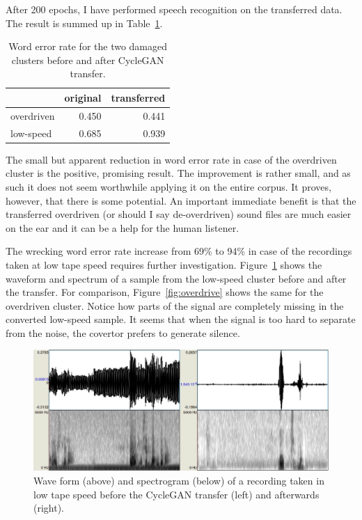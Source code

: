 \documentclass[runningheads,a4paper]{llncs}
\begin{document}
After 200 epochs, I have performed speech recognition on the transferred data.
The result is summed up in Table~\ref{tab:results}.

\begin{table}[htpb]
\begin{center}
\begin{tabular}{|l||r|r|}
\hline
           & original & transferred \\
\hline
overdriven & 0.450 & 0.441 \\
low-speed  & 0.685 & 0.939 \\
\hline
\end{tabular}
\caption{Word error rate for the two damaged clusters before and after CycleGAN
transfer.}\label{tab:results}
\end{center}
\end{table}

The small but apparent reduction in word error rate in case of the overdriven
cluster is the positive, promising result. The improvement is rather small, and
as such it does not seem worthwhile applying it on the entire corpus. It
proves, however, that there is some potential. An important immediate benefit is
that the transferred overdriven (or should I say de-overdriven) sound files are
much easier on the ear and it can be a help for the human listener.

The wrecking word error rate increase from 69\% to 94\% in case of the
recordings taken at low tape speed requires further investigation.
Figure~\ref{fig:plzen} shows the waveform and spectrum of a sample from the low-speed
cluster before and after the transfer. For comparison,
Figure~\ref{fig:overdrive} shows the same for the overdriven cluster.
Notice how parts of the signal are completely missing in the converted low-speed
sample. It seems that when the signal is too hard to separate from the noise,
the covertor prefers to generate silence.

\begin{figure}[htpb]
\includegraphics[scale=0.4]{rc/plzen.eps}
\caption{Wave form (above) and spectrogram (below) of a recording taken in low
tape speed before the CycleGAN transfer (left) and afterwards (right).}
\label{fig:plzen}
\end{figure}
\end{document}
